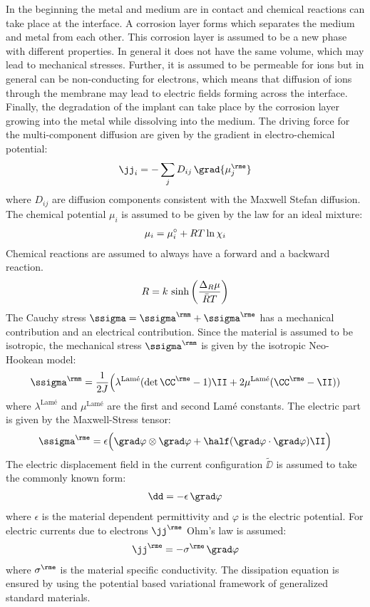 In the beginning the metal and medium are in contact and chemical reactions can take place at the interface. A corrosion layer forms which separates the medium and metal from each other. This corrosion layer is assumed to be a new phase with different properties. In general it does not have the same volume, which may lead to mechanical stresses. Further, it is assumed to be permeable for ions but in general can be non-conducting for electrons, which means that diffusion of ions through the membrane may lead to electric fields forming across the interface. Finally, the degradation of the implant can take place by the corrosion layer growing into the metal while dissolving into the medium. The driving force for the multi-component diffusion are given by the gradient in electro-chemical potential:
\begin{align}
  \jj_i = -\sum_j D_{ij} \, \grad{\mu_j^\rme}
\end{align}
where $D_{ij}$ are diffusion components consistent with the Maxwell Stefan diffusion. The chemical potential $\mu_i$ is assumed to be given by the law for an ideal mixture: 
\begin{align}
  \mu_i = \mu_{i}^{\circ} + RT \ln{\chi_i}
\end{align}
Chemical reactions are assumed to always have a forward and a backward reaction. 
\begin{align}
  R = k\,\sinh\bigg(\frac{\Delta_R \mu}{\bar{R}T}\bigg)
\end{align}
The Cauchy stress $\ssigma=\ssigma^\rmm+\ssigma^\rme$ has a mechanical contribution and an electrical contribution. Since the material is assumed to be isotropic, the mechanical stress $\ssigma^\rmm$ is given by the isotropic Neo-Hookean model: 
\begin{align}
  \ssigma^\rmm = \frac{1}{2J} \Big( \lambda^{\text{Lam\'e}}(\det\CCe-1)\II+2\mu^{\text{Lam\'e}}(\CCe-\II))
\end{align}
where $\lambda^{\text{Lam\'e}}$ and $\mu^{\text{Lam\'e}}$ are the first and second Lam\'e constants.
The electric part is given by the Maxwell-Stress tensor:
\begin{align}
  \ssigma^\rme = \epsilon \Big(\grad\varphi \otimes \grad\varphi + \half (\grad\varphi \cdot \grad\varphi) \II \Big)
\end{align}
The electric displacement field in the current configuration $\tilde \DD$ is assumed to take the commonly known form: 
\begin{align}
  \dd = -\epsilon \, \grad \varphi
\end{align}
where $\epsilon$ is the material dependent permittivity and $\varphi$ is the electric potential. For electric currents due to electrons $\jj^\rme$ Ohm's law is assumed:
\begin{align}
  \jj^\rme = -\sigma^\rme \, \grad \varphi
\end{align}
where $\sigma^\rme$ is the material specific conductivity.
The dissipation equation is ensured by using the potential based variational framework of generalized standard materials.  
